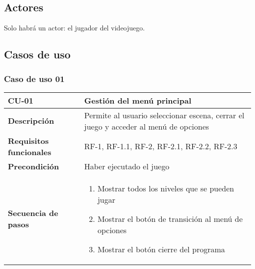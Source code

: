 \subsection{Actores}
Solo habrá un actor: el jugador del videojuego.
\subsection{Casos de uso}

\subsubsection{Caso de uso 01}

\begin{longtable}{l|l}
\begin{minipage}{0.25\columnwidth}
\textbf{CU-01} 
\end{minipage}
&
\begin{minipage}{0.65\columnwidth}
Gestión del menú principal
\end{minipage}
\\ \hline

\begin{minipage}{0.25\columnwidth}
\textbf{Descripción} 
\end{minipage}
&
\begin{minipage}{0.65\columnwidth}
Permite al usuario seleccionar escena, cerrar el juego y acceder al menú de opciones
\end{minipage}
\\ \hline

\begin{minipage}{0.25\columnwidth}
\textbf{Requisitos funcionales} 
\end{minipage}
&
\begin{minipage}{0.65\columnwidth}
RF-1, RF-1.1, RF-2, RF-2.1, RF-2.2, RF-2.3                                                                                                                    
\end{minipage}
\\ \hline

\begin{minipage}{0.25\columnwidth}
\textbf{Precondición} 
\end{minipage}
&
\begin{minipage}{0.65\columnwidth}
Haber ejecutado el juego
\end{minipage}
\\ \hline

\begin{minipage}{0.25\columnwidth}
\textbf{Secuencia de pasos} 
\end{minipage}
&
\begin{minipage}{0.65\columnwidth}
\begin{enumerate}
\item
Mostrar todos los niveles que se pueden jugar
\item
Mostrar el botón de transición al menú de opciones
\item
Mostrar el botón cierre del programa
\end{enumerate}
\end{minipage}
\\ \hline


\end{longtable}

